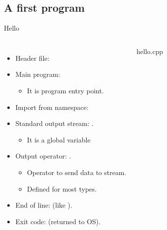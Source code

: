 \subsection{A first program}

\begin{frame}{Hello}
\begin{columns}[T]

  \begin{itemize}
    \item Header file: 
    \item Main program: 
        \begin{itemize}
          \item It is program entry point.
        \end{itemize}
    \item Import from namespace: 
    \item Standard output stream: .
        \begin{itemize}
          \item It is a global variable
        \end{itemize}
    \item Output operator: \cppkey{<{}<}.
        \begin{itemize}
          \item Operator to send data to stream.
          \item Defined for most types.
        \end{itemize}
    \item End of line:  (like ).
    \item Exit code:  (returned to OS).
  \end{itemize}

\begin{block}{hello.cpp}

\end{block}

\end{columns}
\end{frame}
